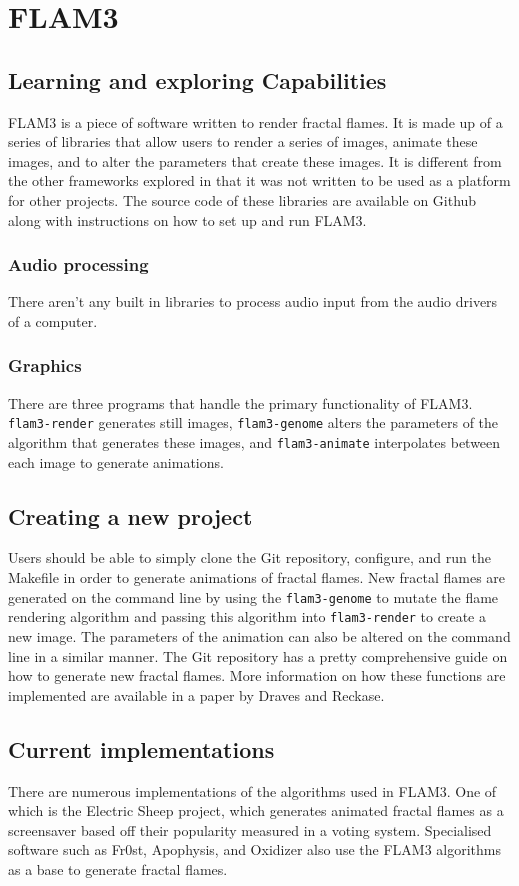 \documentclass[../main_frameworkreview.tex]{subfiles}
\begin{document}
\section{FLAM3}

\subsection{Learning and exploring Capabilities}
FLAM3 is a piece of software written to render fractal flames. It is made up of a series of libraries that allow users to render a series of images, animate these images, and to alter the parameters that create these images. It is different from the other frameworks explored in that it was not written to be used as a platform for other projects. The source code of these libraries are available on Github along with instructions on how to set up and run FLAM3.
\subsubsection{Audio processing}
There aren't any built in libraries to process audio input from the audio drivers of a computer.
\subsubsection{Graphics}
There are three programs that handle the primary functionality of FLAM3. \verb|flam3-render| generates still images, \verb|flam3-genome| alters the parameters of the algorithm that generates these images, and \verb|flam3-animate| interpolates between each image to generate animations.

\subsection{Creating a new project}
Users should be able to simply clone the Git repository, configure, and run the Makefile in order to generate animations of fractal flames. New fractal flames are generated on the command line by using the \verb|flam3-genome| to mutate the flame rendering algorithm and passing this algorithm into \verb|flam3-render| to create a new image. The parameters of the animation can also be altered on the command line in a similar manner. The Git repository has a pretty comprehensive guide on how to generate new fractal flames.\cite{Draves} More information on how these functions are implemented are available in a paper by Draves and Reckase.\cite{Draves2003}
\subsection{Current implementations}
There are numerous implementations of the algorithms used in FLAM3. One of which is the Electric Sheep project, which generates animated fractal flames as a screensaver based off their popularity measured in a voting system.\cite{Dravesa} Specialised software such as Fr0st, Apophysis, and Oxidizer also use the FLAM3 algorithms as a base to generate fractal flames.\cite{Dravesb}
\end{document}
